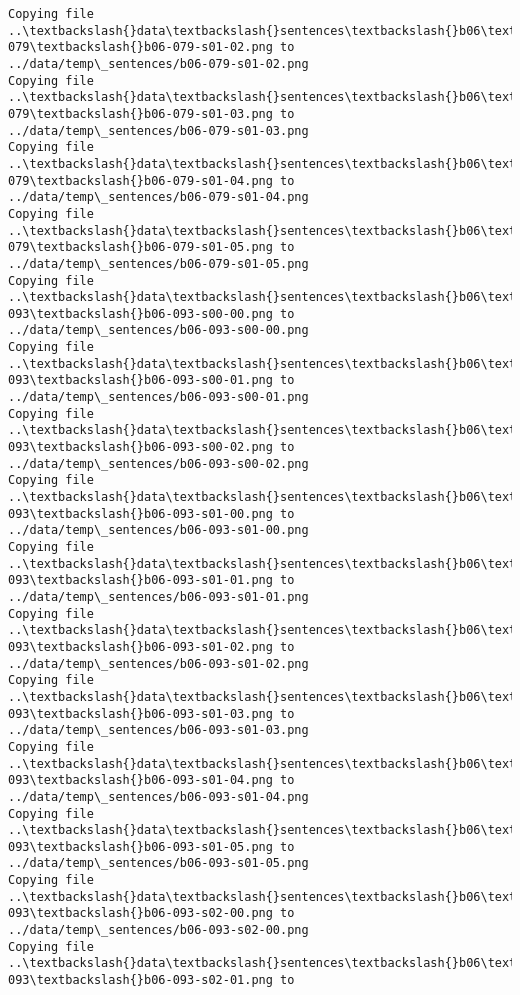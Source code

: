 \documentclass[11pt]{article}
\begin{document}
\begin{Verbatim}[commandchars=\\\{\}]
Copying file ..\textbackslash{}data\textbackslash{}sentences\textbackslash{}b06\textbackslash{}b06-079\textbackslash{}b06-079-s01-02.png to
../data/temp\_sentences/b06-079-s01-02.png
Copying file ..\textbackslash{}data\textbackslash{}sentences\textbackslash{}b06\textbackslash{}b06-079\textbackslash{}b06-079-s01-03.png to
../data/temp\_sentences/b06-079-s01-03.png
Copying file ..\textbackslash{}data\textbackslash{}sentences\textbackslash{}b06\textbackslash{}b06-079\textbackslash{}b06-079-s01-04.png to
../data/temp\_sentences/b06-079-s01-04.png
Copying file ..\textbackslash{}data\textbackslash{}sentences\textbackslash{}b06\textbackslash{}b06-079\textbackslash{}b06-079-s01-05.png to
../data/temp\_sentences/b06-079-s01-05.png
Copying file ..\textbackslash{}data\textbackslash{}sentences\textbackslash{}b06\textbackslash{}b06-093\textbackslash{}b06-093-s00-00.png to
../data/temp\_sentences/b06-093-s00-00.png
Copying file ..\textbackslash{}data\textbackslash{}sentences\textbackslash{}b06\textbackslash{}b06-093\textbackslash{}b06-093-s00-01.png to
../data/temp\_sentences/b06-093-s00-01.png
Copying file ..\textbackslash{}data\textbackslash{}sentences\textbackslash{}b06\textbackslash{}b06-093\textbackslash{}b06-093-s00-02.png to
../data/temp\_sentences/b06-093-s00-02.png
Copying file ..\textbackslash{}data\textbackslash{}sentences\textbackslash{}b06\textbackslash{}b06-093\textbackslash{}b06-093-s01-00.png to
../data/temp\_sentences/b06-093-s01-00.png
Copying file ..\textbackslash{}data\textbackslash{}sentences\textbackslash{}b06\textbackslash{}b06-093\textbackslash{}b06-093-s01-01.png to
../data/temp\_sentences/b06-093-s01-01.png
Copying file ..\textbackslash{}data\textbackslash{}sentences\textbackslash{}b06\textbackslash{}b06-093\textbackslash{}b06-093-s01-02.png to
../data/temp\_sentences/b06-093-s01-02.png
Copying file ..\textbackslash{}data\textbackslash{}sentences\textbackslash{}b06\textbackslash{}b06-093\textbackslash{}b06-093-s01-03.png to
../data/temp\_sentences/b06-093-s01-03.png
Copying file ..\textbackslash{}data\textbackslash{}sentences\textbackslash{}b06\textbackslash{}b06-093\textbackslash{}b06-093-s01-04.png to
../data/temp\_sentences/b06-093-s01-04.png
Copying file ..\textbackslash{}data\textbackslash{}sentences\textbackslash{}b06\textbackslash{}b06-093\textbackslash{}b06-093-s01-05.png to
../data/temp\_sentences/b06-093-s01-05.png
Copying file ..\textbackslash{}data\textbackslash{}sentences\textbackslash{}b06\textbackslash{}b06-093\textbackslash{}b06-093-s02-00.png to
../data/temp\_sentences/b06-093-s02-00.png
Copying file ..\textbackslash{}data\textbackslash{}sentences\textbackslash{}b06\textbackslash{}b06-093\textbackslash{}b06-093-s02-01.png to

\end{Verbatim}
\end{document}
